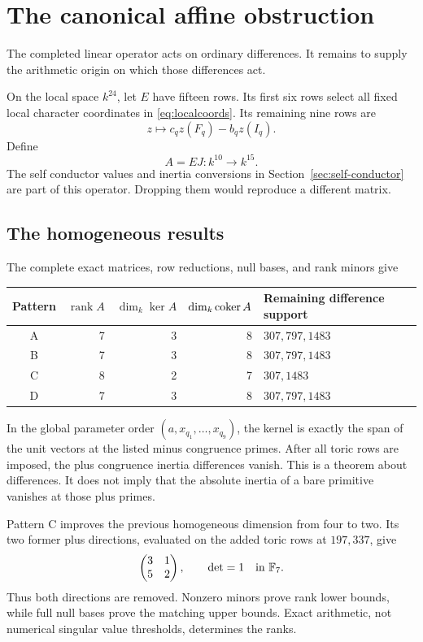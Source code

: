 \section{The canonical affine obstruction}\label{sec:affine}
The completed linear operator acts on ordinary differences. It remains to supply the arithmetic origin on which those differences act.

On the local space $k^{24}$, let $E$ have fifteen rows. Its first six rows select all fixed local character coordinates in \eqref{eq:localcoords}. Its remaining nine rows are
\[
z\longmapsto c_qz(F_q)-b_qz(I_q).
\]
Define
\begin{equation}\label{eq:A}
A=EJ:k^{10}\longrightarrow k^{15}.
\end{equation}
The self conductor values and inertia conversions in Section~\ref{sec:self-conductor} are part of this operator. Dropping them would reproduce a different matrix.

\subsection{The homogeneous results}
The complete exact matrices, row reductions, null bases, and rank minors give
\begin{center}
\begin{tabular}{crrrl}\toprule
Pattern&$\operatorname{rank}A$&$\dim_k\ker A$&$\dim_k\operatorname{coker} A$&Remaining difference support\\\midrule
A&7&3&8&$307,797,1483$\\
B&7&3&8&$307,797,1483$\\
C&8&2&7&$307,1483$\\
D&7&3&8&$307,797,1483$\\\bottomrule
\end{tabular}
\end{center}
In the global parameter order $(a,x_{q_1},\ldots,x_{q_9})$, the kernel is exactly the span of the unit vectors at the listed minus congruence primes. After all toric rows are imposed, the plus congruence inertia differences vanish. This is a theorem about differences. It does not imply that the absolute inertia of a bare primitive vanishes at those plus primes.

Pattern C improves the previous homogeneous dimension from four to two. Its two former plus directions, evaluated on the added toric rows at $197,337$, give
\[
\begin{pmatrix}3&1\\5&2\end{pmatrix},\qquad\det=1\quad\text{in }\mathbb F_7.
\]
Thus both directions are removed. Nonzero minors prove rank lower bounds, while full null bases prove the matching upper bounds. Exact arithmetic, not numerical singular value thresholds, determines the ranks.

